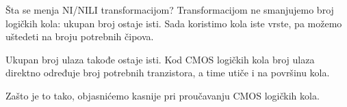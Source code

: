 \begin{frame}[label=02-s027]{Šta se menja NI/NILI transformacijom?}
\vspace{2mm}
Transformacijom \alert{ne smanjujemo broj logičkih kola}: ukupan broj ostaje isti. Sada koristimo kola \alert{iste vrste}, pa možemo uštedeti na broju potrebnih čipova.
\par\vspace{4mm}
\vspace{2mm}
\alert{Ukupan broj ulaza takođe ostaje isti}. Kod CMOS logičkih kola broj ulaza direktno određuje broj potrebnih tranzistora, a time utiče i na površinu kola.
\par\vspace{4mm}
\par\vspace{2mm}
Zašto je to tako, objasnićemo kasnije pri proučavanju CMOS logičkih kola.
\end{frame}
